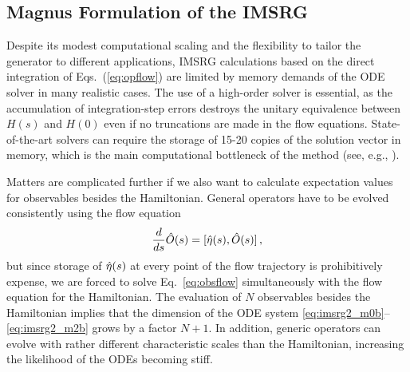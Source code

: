 {%
\subsection{\label{sec:current_magnus}Magnus Formulation of the IMSRG}

Despite its modest computational scaling and the flexibility to tailor 
the generator to different applications, IMSRG calculations based on 
the direct integration of Eqs.~(\ref{eq:opflow}) are limited by memory 
demands of the ODE solver in many realistic cases. The use of a
high-order solver is essential, as the accumulation of integration-step
errors destroys the unitary equivalence between $H(s)$ and $H(0)$ even
if no truncations are made in the flow equations. State-of-the-art
solvers can require the storage of 15-20 copies of the solution vector
in memory, which is the main computational bottleneck of the method
(see, e.g., \cite{Hindmarsh:1983pd,Brown:1989qd,Hindmarsh:2005kl}).

Matters are complicated further if we also want to calculate expectation
values for observables besides the Hamiltonian. General operators have
to be evolved consistently using the flow equation 
\begin{equation} \label{eq:obsflow}
  \totd{}{s} \OO(s) = \comm{\etaO(s)}{\OO(s)}\,,
\end{equation}
but since storage of $\hat{\eta}(s)$ at every point of the flow trajectory
is prohibitively expense, we are forced to solve Eq.~\eqref{eq:obsflow} 
simultaneously with the flow equation for the Hamiltonian. The evaluation
of $N$ observables besides the Hamiltonian implies that the dimension of
the ODE system \eqref{eq:imsrg2_m0b}--\eqref{eq:imsrg2_m2b} grows by a
factor $N+1$. In addition, generic operators can evolve with rather different 
characteristic scales than the Hamiltonian, increasing the likelihood of 
the ODEs becoming stiff.

}
